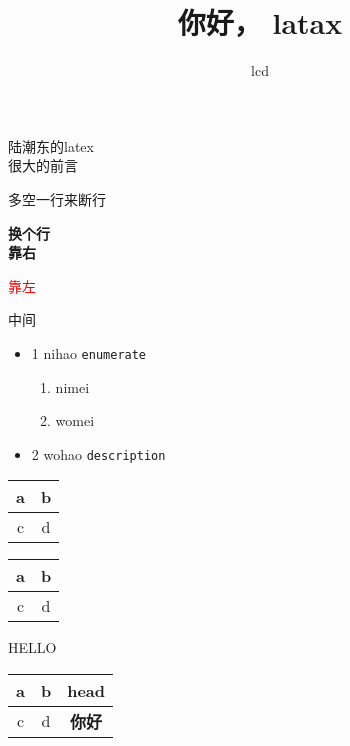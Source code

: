 \documentclass[a4paper, 12pt]{ctexart}
\begin{document}
\begin{spacing}{1.5}  %

\title{你好， latax}
\author{lcd}
\maketitle
\newpage


\begin{flushleft}
        \large{陆潮东的latex}\\
        \huge{很大的前言}

        多空一行来断行

        \bf{换个行} \\
        \vspace{2ex}   %
        靠右
\end{flushleft}

\begin{flushright}
        \textcolor{red}{靠左}
\end{flushright}


\begin{center}
        中间
\end{center}

\begin{itemize}
        \item 1 nihao \texttt{enumerate}
                \begin{enumerate}
                        \item nimei
                        \item womei
                \end{enumerate}
        \item 2 wohao \texttt{description}
\end{itemize}


\newpage

\begin{tabular}{c|c}
        \hline
        a & b \\
        \hline
        c & d \\
        \hline
\end{tabular}

\begin{center}
        \begin{tabular}{|c|c|}
                \hline
                a & b \\ \hline
                c & d \\
                \hline
        \end{tabular}
\end{center}

\begin{center}
        HELLO \\ 
        \begin{tabular}{|c|c|c|}
                \hline
                a & b & head \\ 
                \hline
                c & d & \textbf{你好} \\
                \hline
        \end{tabular}
\end{center}

\end{spacing}
\end{document}
